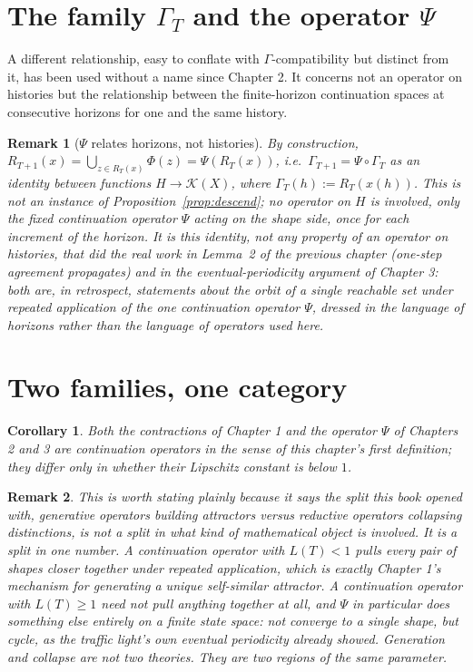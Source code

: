 \documentclass[11pt]{report}
\newtheorem{remark}{Remark}[chapter]
\newtheorem{corollary}{Corollary}[chapter]
\begin{document}
\section*{The family $\Gamma_T$ and the operator $\Psi$}

A different relationship, easy to conflate with $\Gamma$-compatibility
but distinct from it, has been used without a name since Chapter 2. It
concerns not an operator on histories but the relationship between the
finite-horizon continuation spaces at consecutive horizons for one and
the same history.

\begin{remark}[$\Psi$ relates horizons, not histories]
By construction, $R_{T+1}(x) = \bigcup_{z \in R_T(x)} \Phi(z) =
\Psi(R_T(x))$, i.e.\ $\Gamma_{T+1} = \Psi \circ \Gamma_T$ as an
identity between functions $H \to \mathcal{K}(X)$, where
$\Gamma_T(h) := R_T(x(h))$. This is not an instance of
Proposition~\ref{prop:descend}; no operator on $H$ is involved, only
the fixed continuation operator $\Psi$ acting on the shape side, once
for each increment of the horizon. It is this identity, not any
property of an operator on histories, that did the real work in
Lemma~2 of the previous chapter (one-step agreement propagates) and in
the eventual-periodicity argument of Chapter 3: both are, in
retrospect, statements about the orbit of a single reachable set
under repeated application of the one continuation operator $\Psi$,
dressed in the language of horizons rather than the language of
operators used here.
\end{remark}

\section*{Two families, one category}

\begin{corollary}
Both the contractions of Chapter 1 and the operator $\Psi$ of Chapters
2 and 3 are continuation operators in the sense of this chapter's
first definition; they differ only in whether their Lipschitz
constant is below $1$.
\end{corollary}

\begin{remark}
This is worth stating plainly because it says the split this book
opened with, generative operators building attractors versus
reductive operators collapsing distinctions, is not a split in what
kind of mathematical object is involved. It is a split in one number.
A continuation operator with $L(T) < 1$ pulls every pair of shapes
closer together under repeated application, which is exactly
Chapter 1's mechanism for generating a unique self-similar attractor.
A continuation operator with $L(T) \geq 1$ need not pull anything
together at all, and $\Psi$ in particular does something else
entirely on a finite state space: not converge to a single shape, but
cycle, as the traffic light's own eventual periodicity already showed.
Generation and collapse are not two theories. They are two regions of
the same parameter.
\end{remark}
\end{document}
